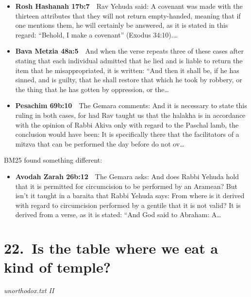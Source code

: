 \documentclass[11pt,a4paper]{article}
\begin{document}
\begin{itemize}[leftmargin=1.2em,itemsep=3pt]
\item {\color{ref}\textbf{Rosh Hashanah 17b:7}}\ \ Rav Yehuda said: A covenant was made with the thirteen attributes that they will not return empty-handed, meaning that if one mentions them, he will certainly be answered, as it is stated in this regard: “Behold, I make a covenant” (Exodus 34:10).\ldots
\item {\color{ref}\textbf{Bava Metzia 48a:5}}\ \ And when the verse repeats three of these cases after stating that each individual admitted that he lied and is liable to return the item that he misappropriated, it is written: “And then it shall be, if he has sinned, and is guilty, that he shall restore that which he took by robbery, or the thing that he has gotten by oppression, or the\ldots
\item {\color{ref}\textbf{Pesachim 69b:10}}\ \ The Gemara comments: And it is necessary to state this ruling in both cases, for had Rav taught us that the halakha is in accordance with the opinion of Rabbi Akiva only with regard to the Paschal lamb, the conclusion would have been: It is specifically there that the facilitators of a mitzva that can be performed the day before do not ov\ldots
\end{itemize}
{\color{quiet}\small BM25 found something different:}
\begin{itemize}[leftmargin=1.2em]
\item {\color{ref}\textbf{Avodah Zarah 26b:12}}\ \ The Gemara asks: And does Rabbi Yehuda hold that it is permitted for circumcision to be performed by an Aramean? But isn’t it taught in a baraita that Rabbi Yehuda says: From where is it derived with regard to circumcision performed by a gentile that it is not valid? It is derived from a verse, as it is stated: “And God said to Abraham: A\ldots
\end{itemize}

\section*{22.\ Is the table where we eat a kind of temple?}
{\color{quiet}\small\textit{unorthodox.txt II}}
\end{document}
